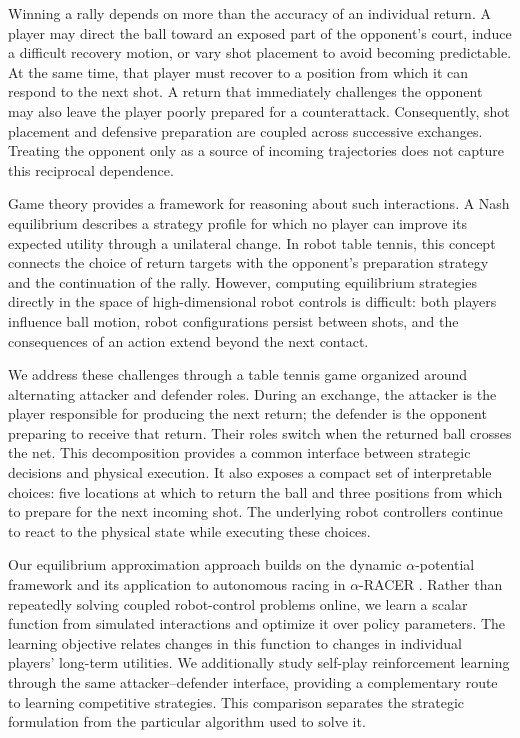 \documentclass[pmlr]{jmlr}
\begin{document}
Winning a rally depends on more than the accuracy of an individual return. A player may direct the ball toward an exposed part of the opponent's court, induce a difficult recovery motion, or vary shot placement to avoid becoming predictable. At the same time, that player must recover to a position from which it can respond to the next shot. A return that immediately challenges the opponent may also leave the player poorly prepared for a counterattack. Consequently, shot placement and defensive preparation are coupled across successive exchanges. Treating the opponent only as a source of incoming trajectories does not capture this reciprocal dependence.

Game theory provides a framework for reasoning about such interactions. A Nash equilibrium describes a strategy profile for which no player can improve its expected utility through a unilateral change. In robot table tennis, this concept connects the choice of return targets with the opponent's preparation strategy and the continuation of the rally. However, computing equilibrium strategies directly in the space of high-dimensional robot controls is difficult: both players influence ball motion, robot configurations persist between shots, and the consequences of an action extend beyond the next contact.

We address these challenges through a table tennis game organized around alternating attacker and defender roles. During an exchange, the attacker is the player responsible for producing the next return; the defender is the opponent preparing to receive that return. Their roles switch when the returned ball crosses the net. This decomposition provides a common interface between strategic decisions and physical execution. It also exposes a compact set of interpretable choices: five locations at which to return the ball and three positions from which to prepare for the next incoming shot. The underlying robot controllers continue to react to the physical state while executing these choices.

Our equilibrium approximation approach builds on the dynamic $\alpha$-potential framework and its application to autonomous racing in $\alpha$-RACER \citep{guo2023markov,guo2024dynamic,kalaria2025racer}. Rather than repeatedly solving coupled robot-control problems online, we learn a scalar function from simulated interactions and optimize it over policy parameters. The learning objective relates changes in this function to changes in individual players' long-term utilities. We additionally study self-play reinforcement learning through the same attacker--defender interface, providing a complementary route to learning competitive strategies. This comparison separates the strategic formulation from the particular algorithm used to solve it.
\end{document}
